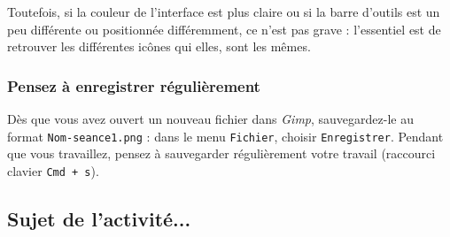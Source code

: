 Toutefois, si la couleur de l'interface est plus claire ou si la barre d'outils est un peu différente ou positionnée différemment, ce n'est pas grave : l'essentiel est de retrouver les différentes icônes qui elles, sont les mêmes.

\subsubsection{Pensez à enregistrer régulièrement}

Dès que vous avez ouvert un nouveau fichier dans \emph{Gimp}, sauvegardez-le au format \texttt{Nom-seance1.png} : dans le menu \texttt{Fichier}, choisir \texttt{Enregistrer}. Pendant que vous travaillez, pensez à sauvegarder régulièrement votre travail (raccourci clavier \texttt{Cmd + s}).   


\vfill
\phantom{rien}

\subsection{Sujet de l'activité...}

\vspace{10pt}

